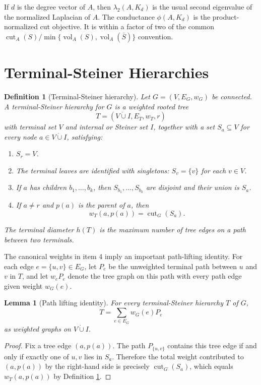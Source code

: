 \documentclass[11pt]{article}
\newtheorem{lemma}[theorem]{Lemma}
\newtheorem{definition}[theorem]{Definition}
\newcommand{\cut}{\operatorname{cut}}
\newcommand{\vol}{\operatorname{vol}}
\begin{document}
If $d$ is the degree vector of $A$, then $\lambda_2(A,K_d)$ is the usual
second eigenvalue of the normalized Laplacian of $A$.  The conductance
$\phi(A,K_d)$ is the product-normalized cut objective.  It is within a factor
of two of the common $\cut_A(S)/\min\{\vol_A(S),\vol_A(\bar S)\}$ convention.

\section{Terminal-Steiner Hierarchies}

\begin{definition}[Terminal-Steiner hierarchy]
\label{def:hierarchy}
Let $G=(V,E_G,w_G)$ be connected.  A terminal-Steiner hierarchy for $G$ is a
weighted rooted tree
\[
  T=(V\dot\cup I,E_T,w_T,r)
\]
with terminal set $V$ and internal or Steiner set $I$, together with a set
$S_a\subseteq V$ for every node $a\in V\dot\cup I$, satisfying:
\begin{enumerate}
\item $S_r=V$.
\item The terminal leaves are identified with singletons: $S_v=\{v\}$ for
each $v\in V$.
\item If $a$ has children $b_1,\ldots,b_k$, then
$S_{b_1},\ldots,S_{b_k}$ are disjoint and their union is $S_a$.
\item If $a\ne r$ and $p(a)$ is the parent of $a$, then
\[
  w_T(a,p(a))=\cut_G(S_a).
\]
\end{enumerate}
The terminal diameter $h(T)$ is the maximum number of tree edges on a path
between two terminals.
\end{definition}

The canonical weights in item 4 imply an important path-lifting identity.  For
each edge $e=\{u,v\}\in E_G$, let $P_e$ be the unweighted terminal path
between $u$ and $v$ in $T$, and let $w_eP_e$ denote the tree graph on this
path with every path edge given weight $w_G(e)$.

\begin{lemma}[Path lifting identity]
\label{lem:path-lifting}
For every terminal-Steiner hierarchy $T$ of $G$,
\[
  T=\sum_{e\in E_G} w_G(e)P_e
\]
as weighted graphs on $V\dot\cup I$.
\end{lemma}

\begin{proof}
Fix a tree edge $(a,p(a))$.  The path $P_{\{u,v\}}$ contains this tree edge
if and only if exactly one of $u,v$ lies in $S_a$.  Therefore the total
weight contributed to $(a,p(a))$ by the right-hand side is precisely
$\cut_G(S_a)$, which equals $w_T(a,p(a))$ by Definition
\ref{def:hierarchy}.
\end{proof}
\end{document}
